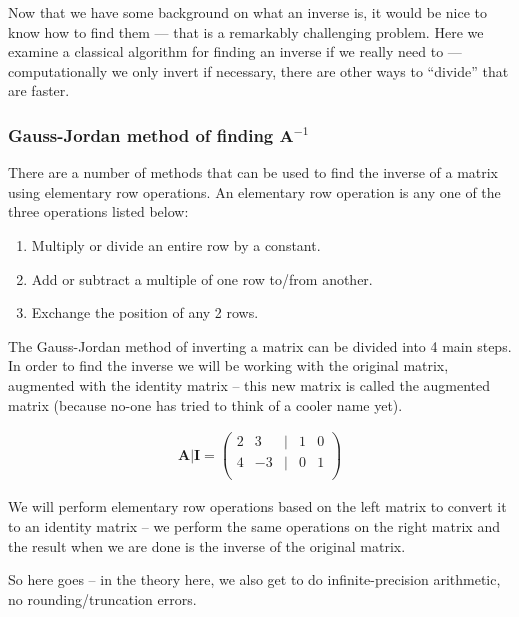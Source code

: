 Now that we have some background on what an inverse is, it would be nice to know how to find them --- that is a remarkably challenging problem.   Here we examine a classical algorithm for finding an inverse if we really need to --- computationally we only invert if necessary, there are other ways to ``divide'' that are faster.

\subsubsection{Gauss-Jordan method of finding $\mathbf{A}^{-1}$}
There are a number of methods that can be used to find the inverse of a matrix using elementary row operations.  
An elementary row operation is any one of the three operations listed below:
\begin{enumerate}
\item Multiply or divide an entire row by a constant.
\item Add or subtract a multiple of one row to/from another.
\item Exchange the position of any 2 rows.
\end{enumerate}

The Gauss-Jordan method of inverting a matrix can be divided into 4 main steps.  
In order to find the inverse we will be working with the original matrix, augmented with the identity matrix -- this new matrix is called the augmented matrix (because no-one has tried to think of a cooler name yet).  

\begin{gather}
\mathbf{A} | \mathbf{I} =
\begin{pmatrix}
2 & 3 & | & 1 & 0 \\
4 & -3 & | & 0 & 1 \\
\end{pmatrix}
\end{gather}

We will perform elementary row operations based on the left matrix to convert it to an identity matrix -- we perform the same operations on the right matrix and the result when we are done is the inverse of the original matrix.

So here goes -- in the theory here, we also get to do infinite-precision arithmetic, no rounding/truncation errors.  

